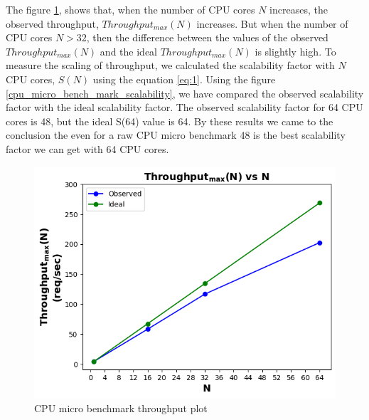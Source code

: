 \documentclass{iitbreport}
\begin{document}
The figure \ref{cpu_micro_bench_mark_throughput}, shows that, when the number of CPU cores $N$ increases, the observed throughput, $Throughput_{max}(N)$ increases. But when the number of CPU cores $N>32$, then the difference between the values of the observed  $Throughput_{max}(N)$  and the ideal $Throughput_{max}(N)$ is slightly high. To measure the scaling of throughput, we calculated the scalability factor with $N$ CPU cores, $S(N)$ using the equation \ref{eq:1}. Using the figure \ref{cpu_micro_bench_mark_scalability}, we have compared the observed scalability factor with the ideal scalability factor. The observed scalability factor  for 64 CPU cores is 48, but the ideal  S(64) value is 64. By these results we came to the conclusion the even for a raw CPU micro benchmark 48 is the best scalability factor we can get with 64 CPU cores.


\begin{figure}[!htb]
  \centering
  \includegraphics[width=\linewidth]{Images/cpu_micro_benchmark_throughput.png}  \caption{CPU micro benchmark throughput plot}
  \label{cpu_micro_bench_mark_throughput}
\end{figure}
\end{document}
